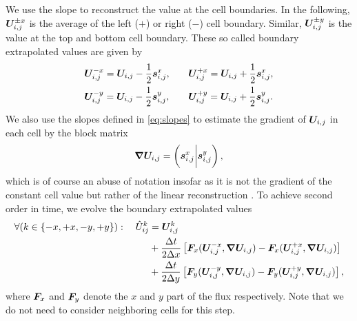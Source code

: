 We use the slope to reconstruct the value at the cell boundaries.
In the following, $\bm{U}_{i,j}^{\pm x}$ is the average of the left ($+$) or right ($-$) cell boundary.
Similar, $\bm{U}_{i,j}^{\pm y}$ is the value at the top and bottom cell boundary.
These so called boundary extrapolated values are given by
\begin{equation}
\begin{alignedat}{2}
& \bm{U}_{i,j}^{- x} = \bm{U}_{i,j} - \frac{1}{2} \bm{s}^{x}_{i,j} , \qquad && \bm{U}_{i,j}^{+ x} = \bm{U}_{i,j} + \frac{1}{2} \bm{s}^{x}_{i,j}, \\
& \bm{U}_{i,j}^{- y} = \bm{U}_{i,j} - \frac{1}{2} \bm{s}^{y}_{i,j} , \qquad && \bm{U}_{i,j}^{+ y} = \bm{U}_{i,j} + \frac{1}{2} \bm{s}^{y}_{i,j}.
\end{alignedat}
\end{equation}
We also use the slopes defined in \cref{eq:slopes} to estimate the gradient of $\bm{U}_{i,j}$ in each cell by the block matrix
\begin{equation}
  \label{eq:muscl-gradient}
  \gradCellAvg = \left( \slope{x} \bigg\rvert \slope{y} \right),
\end{equation}
which is of course an abuse of notation insofar as it is not the gradient of the constant cell value but rather of the linear reconstruction .
To achieve second order in time, we evolve the boundary extrapolated values
\begin{equation}\label{eq:muscl-time-evolution}
  \begin{split}
    \forall (k \in \{-x, +x, -y, +y \} ): \quad  \hat{U}_{ij}^k &= \cellAvg^k
\\&+ \frac{\Delta t}{2 \Delta x} \left[ \fluxX(\cellAvg^{-x}, \gradCellAvg) - \fluxX(\cellAvg^{+x}, \gradCellAvg) \right]
\\&+ \frac{\Delta t}{2 \Delta y} \left[ \fluxY(\cellAvg^{-y}, \gradCellAvg) - \fluxY(\cellAvg^{+y}, \gradCellAvg) \right],
  \end{split}
\end{equation}
where $\bm{F}_x$ and $\bm{F}_y$ denote the $x$ and $y$ part of the flux respectively.
Note that we do not need to consider neighboring cells for this step.

